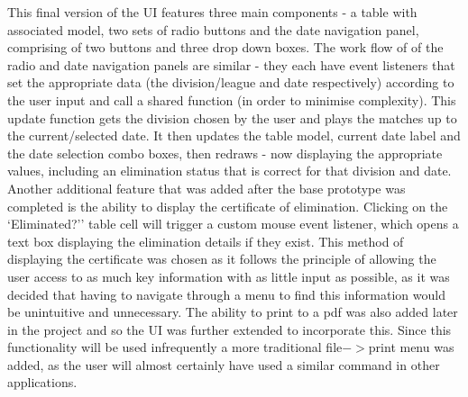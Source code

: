 This final version of the UI features three main components - a table with
associated model,  two sets of radio buttons and the date navigation panel,
comprising of two buttons and three drop down boxes. The work flow of of the
radio and date navigation panels are similar - they each have event listeners that
set the appropriate data (the division/league and date respectively) 
according to the user input and call a shared function  (in order to minimise complexity). 
This update function gets the division chosen by the user and plays the 
matches up to the current/selected date. It then updates the table model, 
current date label and the date selection combo boxes, then redraws - now 
displaying the appropriate values, including an elimination status that is correct 
for that division and date. Another additional feature that was added after the base
prototype was completed is the ability to display the certificate of
elimination. Clicking on the `Eliminated?'' table cell will trigger a custom
mouse event listener, which opens a  text box displaying the elimination details
if they exist. This method of displaying the certificate was chosen as it
follows the principle of allowing the user access to as much key information
with as little input as possible, as it was decided that having to navigate
through a menu to find this  information would be unintuitive and unnecessary.
The ability to print to a pdf was also added later in the project and so the UI
was further extended to incorporate this. Since this functionality will be used
infrequently a more traditional file$-$$>$print menu was added, as the user will
almost certainly have used a similar command in other applications.
